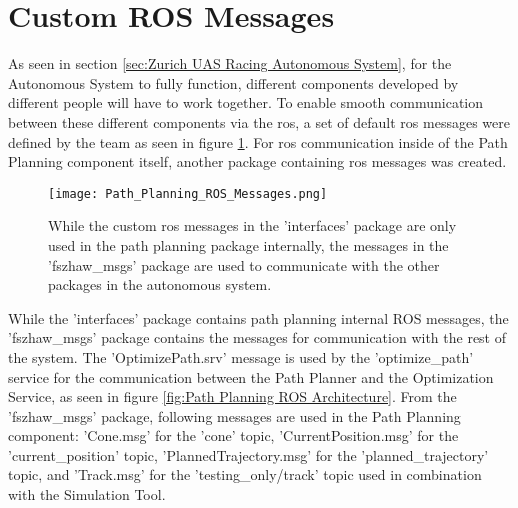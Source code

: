 \section{Custom ROS Messages} \label{sec:Custom ROS Messages}
As seen in section \ref{sec:Zurich UAS Racing Autonomous System}, for the Autonomous System to fully function, different components developed by different people will have to work together. To enable smooth communication between these different components via the \acrlong{ros}, a set of default \acrshort{ros} messages were defined by the team as seen in figure \ref{fig:Path Planning ROS Messages}. For \acrshort{ros} communication inside of the Path Planning component itself, another package containing \acrshort{ros} messages was created.
\begin{figure}[H]
    \centering
    \texttt{[image: Path\_Planning\_ROS\_Messages.png]}
    \caption{While the custom \acrshort{ros} messages in the 'interfaces' package are only used in the path planning package internally, the messages in the 'fszhaw\_msgs' package are used to communicate with the other packages in the autonomous system.}
    \label{fig:Path Planning ROS Messages}
\end{figure}
While the 'interfaces' package contains path planning internal ROS messages, the 'fszhaw\_msgs' package contains the messages for communication with the rest of the system. The 'OptimizePath.srv' message is used by the 'optimize\_path' service for the communication between the Path Planner and the Optimization Service, as seen in figure \ref{fig:Path Planning ROS Architecture}. From the 'fszhaw\_msgs' package, following messages are used in the Path Planning component: 'Cone.msg' for the 'cone' topic, 'CurrentPosition.msg' for the 'current\_position' topic, 'PlannedTrajectory.msg' for the 'planned\_trajectory' topic, and 'Track.msg' for the 'testing\_only/track' topic used in combination with the Simulation Tool.

